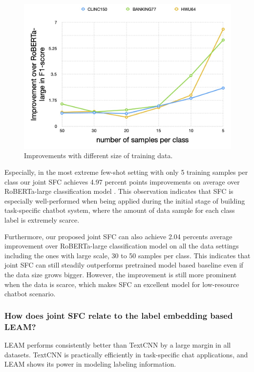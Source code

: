 \documentclass[letterpaper]{article} %
\begin{document}
  \begin{figure}[t]
    \begin{centering}
      \includegraphics[scale=0.2]{picture/improvement_trend.jpg} 
      \par
    \end{centering}
    \caption{
      Improvements with different size of training data.
    }
    \label{fig:trend}
  \end{figure}

  Especially,  in the most extreme few-shot setting with only 5 training samples
  per  class  our joint SFC achieves 4.97 percent points improvements on average
  over  RoBERTa-large classification model . This observation indicates that SFC
  is  especially  well-performed  when being applied during the initial stage of
  building  task-specific  chatbot  system,  where the amount of data sample for
  each class label is extremely scarce.

  Furthermore,  our  proposed  joint  SFC can also achieve 2.04 percents average
  improvement  over  RoBERTa-large classification model on all the data settings
  including  the  ones  with  large  scale,  30  to  50  samples per class. This
  indicates that joint SFC can still steadily outperforms pretrained model based
  baseline even if the data size grows bigger. However, the improvement is still
  more prominent when the data is scarce, which makes SFC an excellent model for
  low-resource chatbot scenario.

  \subsubsection*{How does joint SFC relate to the label  embedding based  LEAM?}
  LEAM performs consistently better than TextCNN by a large margin in all
  datasets. TextCNN is practically efficiently in task-specific chat
  applications, and LEAM shows its power in modeling labeling information.
\end{document}
